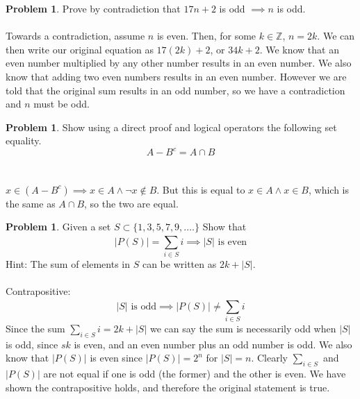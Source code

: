 \documentclass[10pt,leqno ]{article}
\theoremstyle{definition}
\newtheorem{problem}[theorem]{Problem}
\begin{document}
\begin{problem} Prove by contradiction that $17n + 2$ is odd $\implies n$ is odd.
\\\\
\Large
Towards a contradiction, assume $n$ is even.  Then, for some $k \in \mathbb{Z}$, $n = 2k$.  We can then write our original equation as $17(2k) + 2$, or $34k + 2$.  We know that an even number multiplied by any other number results in an even number.  We also know that adding two even numbers results in an even number.  However we are told that the original sum results in an odd number, so  we have a contradiction and $n$ must be odd.
\end{problem}
\newpage


\begin{problem} Show using a direct proof and logical operators the following set equality.
$$A - B^c = A \cap B$$
\\\\
\Large
$x \in (A - B^c) \implies x \in A \wedge \neg x \notin B$.  But this is equal to $x \in A \wedge x \in B$, which is the same as $A \cap B$, so the two are equal.
\end{problem}
\newpage


\begin{problem} Given a set $S \subset \{1, 3, 5, 7, 9, .\dots \}$ Show that
$$ |P(S)| =  \sum_{i \in S}^{}i \implies |S| \text{ is even}$$
Hint:  The sum of elements in $S$ can be written as $2k+|S|$.
\\\\
\Large
Contrapositive:
$$|S| \text{ is odd} \implies |P(S)| \neq \sum_{i \in S}^{}i$$
Since the sum $\sum_{i \in S}^{}i = 2k + |S|$ we can say the sum is necessarily odd when $|S|$ is odd, since $sk$ is even, and an even number plus an odd number is odd.  We also know that $|P(S)|$ is even since $|P(S)| = 2^n$ for $|S| = n$.  Clearly $\sum_{i \in S}^{}$ and $|P(S)|$ are not equal if one is odd (the former) and the other is even.  We have shown the contrapositive holds, and therefore the original statement is true.
\end{problem}
\newpage
\end{document}
